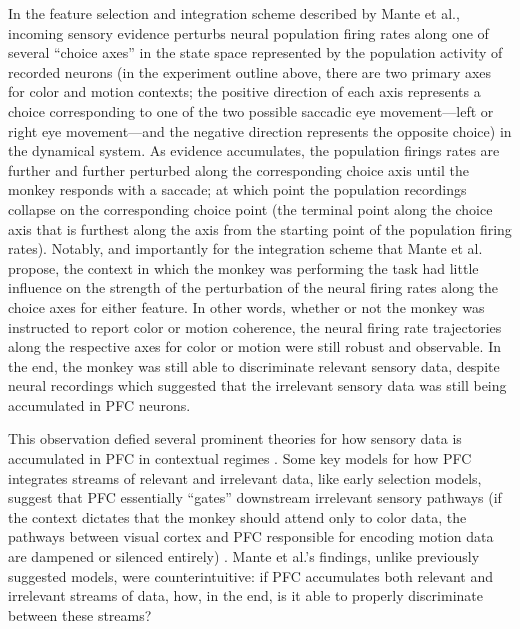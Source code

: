 \documentclass[12pt,a4paper,final]{iopart}
\begin{document}
In the feature selection and integration scheme described by Mante et al., incoming sensory evidence perturbs neural population firing rates along one of several ``choice axes'' in the state space represented by the population activity of recorded neurons (in the experiment outline above, there are two primary axes for color and motion contexts; the positive direction of each axis represents a choice corresponding to one of the two possible saccadic eye movement—left or right eye movement—and the negative direction represents the opposite choice) in the dynamical system. As evidence accumulates, the population firings rates are further and further perturbed along the corresponding choice axis until the monkey responds with a saccade; at which point the population recordings collapse on the corresponding choice point (the terminal point along the choice axis that is furthest along the axis from the starting point of the population firing rates). Notably, and importantly for the integration scheme that Mante et al. propose, the context in which the monkey was performing the task had little influence on the strength of the perturbation of the neural firing rates along the choice axes for either feature. In other words, whether or not the monkey was instructed to report color or motion coherence, the neural firing rate trajectories along the respective axes for color or motion were still robust and observable. In the end, the monkey was still able to discriminate relevant sensory data, despite neural recordings which suggested that the irrelevant sensory data was still being accumulated in PFC neurons.

This observation defied several prominent theories for how sensory data is accumulated in PFC in contextual regimes \cite{Mante2013}. Some key models for how PFC integrates streams of relevant and irrelevant data, like early selection models, suggest that PFC essentially “gates” downstream irrelevant sensory pathways (if the context dictates that the monkey should attend only to color data, the pathways between visual cortex and PFC responsible for encoding motion data are dampened or silenced entirely) \cite{JDCohen:2001}. Mante et al.'s findings, unlike previously suggested models, were counterintuitive: if PFC accumulates both relevant and irrelevant streams of data, how, in the end, is it able to properly discriminate between these streams?
\end{document}
